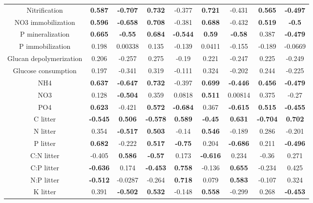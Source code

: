 \documentclass[authoryear,preprint,review,12pt]{elsarticle}
\begin{document}
\begin{table}[h!]
\begin{center}
{\begin{tabular}{ccccccccc}
  Nitrification & \textbf{ 0.587 } & \textbf{ -0.707 } & \textbf{ 0.732 } & -0.377 & \textbf{ 0.721 } & -0.431 & \textbf{ 0.565 } & \textbf{ -0.497 } \\ 
  NO3 immobilization & \textbf{ 0.596 } & \textbf{ -0.658 } & \textbf{ 0.708 } & -0.381 & \textbf{ 0.688 } & -0.432 & \textbf{ 0.519 } & \textbf{ -0.5 } \\ 
  P mineralization & \textbf{ 0.665 } & \textbf{ -0.55 } & \textbf{ 0.684 } & \textbf{ -0.544 } & \textbf{ 0.59 } & \textbf{ -0.58 } & 0.387 & \textbf{ -0.479 } \\ 
  P immobilization & 0.198 & 0.00338 & 0.135 & -0.139 & 0.0411 & -0.155 & -0.189 & -0.0669 \\ 
  Glucan depolymerization & 0.206 & -0.257 & 0.275 & -0.19 & 0.221 & -0.247 & 0.225 & -0.249 \\ 
  Glucose consumption & 0.197 & -0.341 & 0.319 & -0.111 & 0.324 & -0.202 & 0.244 & -0.225 \\ 
  NH4 & \textbf{ 0.637 } & \textbf{ -0.647 } & \textbf{ 0.732 } & -0.397 & \textbf{ 0.699 } & \textbf{ -0.446 } & \textbf{ 0.456 } & \textbf{ -0.479 } \\ 
  NO3 & 0.128 & \textbf{ -0.504 } & 0.359 & 0.0818 & \textbf{ 0.511 } & 0.00814 & 0.375 & -0.27 \\ 
  PO4 & \textbf{ 0.623 } & -0.421 & \textbf{ 0.572 } & \textbf{ -0.684 } & 0.367 & \textbf{ -0.615 } & \textbf{ 0.515 } & \textbf{ -0.455 } \\ 
  C litter & \textbf{ -0.545 } & \textbf{ 0.506 } & \textbf{ -0.578 } & \textbf{ 0.589 } & \textbf{ -0.45 } & \textbf{ 0.631 } & \textbf{ -0.704 } & \textbf{ 0.702 } \\ 
  N litter & 0.354 & \textbf{ -0.517 } & \textbf{ 0.503 } & -0.14 & \textbf{ 0.546 } & -0.189 & 0.286 & -0.201 \\ 
  P litter & \textbf{ 0.682 } & -0.222 & \textbf{ 0.517 } & \textbf{ -0.75 } & 0.204 & \textbf{ -0.686 } & 0.211 & \textbf{ -0.496 } \\ 
  C:N litter & -0.405 & \textbf{ 0.586 } & \textbf{ -0.57 } & 0.173 & \textbf{ -0.616 } & 0.234 & -0.36 & 0.271 \\ 
  C:P litter & \textbf{ -0.636 } & 0.174 & \textbf{ -0.453 } & \textbf{ 0.758 } & -0.136 & \textbf{ 0.655 } & -0.234 & 0.425 \\ 
  N:P litter & \textbf{ -0.512 } & -0.0287 & -0.264 & \textbf{ 0.718 } & 0.079 & \textbf{ 0.583 } & -0.107 & 0.324 \\ 
  K litter & 0.391 & \textbf{ -0.502 } & \textbf{ 0.532 } & -0.148 & \textbf{ 0.558 } & -0.299 & 0.268 & \textbf{ -0.453 } \\ 

\end{tabular}}
\end{center}
\end{table}
\end{document}

